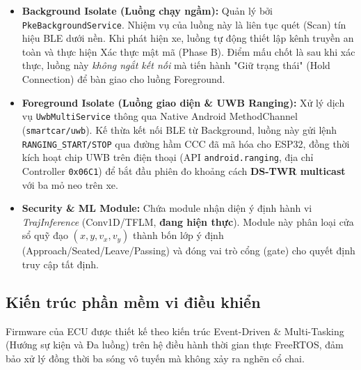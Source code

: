 \begin{itemize}
    \item \textbf{Background Isolate (Luồng chạy ngầm):} Quản lý bởi \texttt{PkeBackgroundService}. Nhiệm vụ của luồng này là liên tục quét (Scan) tín hiệu BLE dưới nền. Khi phát hiện xe, luồng tự động thiết lập kênh truyền an toàn và thực hiện Xác thực mật mã (Phase B). Điểm mấu chốt là sau khi xác thực, luồng này \textit{không ngắt kết nối} mà tiến hành "Giữ trạng thái" (Hold Connection) để bàn giao cho luồng Foreground.
    \item \textbf{Foreground Isolate (Luồng giao diện \& UWB Ranging):} Xử lý dịch vụ \texttt{UwbMultiService} thông qua Native Android MethodChannel (\texttt{smartcar/uwb}). Kế thừa kết nối BLE từ Background, luồng này gửi lệnh \texttt{RANGING\_START/STOP} qua đường hầm CCC đã mã hóa cho ESP32, đồng thời kích hoạt chip UWB trên điện thoại (API \texttt{android.ranging}, địa chỉ Controller \texttt{0x06C1}) để bắt đầu phiên đo khoảng cách \textbf{DS-TWR multicast} với ba mỏ neo trên xe.
    \item \textbf{Security \& ML Module:} Chứa module nhận diện ý định hành vi \textit{TrajInference} (Conv1D/TFLM, \textbf{đang hiện thực}). Module này phân loại cửa sổ quỹ đạo $(x, y, v_x, v_y)$ thành bốn lớp ý định (Approach/Seated/Leave/Passing) và đóng vai trò cổng (gate) cho quyết định truy cập tất định.
\end{itemize}

\subsection{Kiến trúc phần mềm vi điều khiển}

Firmware của ECU được thiết kế theo kiến trúc Event-Driven \& Multi-Tasking (Hướng sự kiện và Đa luồng) trên hệ điều hành thời gian thực FreeRTOS, đảm bảo xử lý đồng thời ba sóng vô tuyến mà không xảy ra nghẽn cổ chai.

